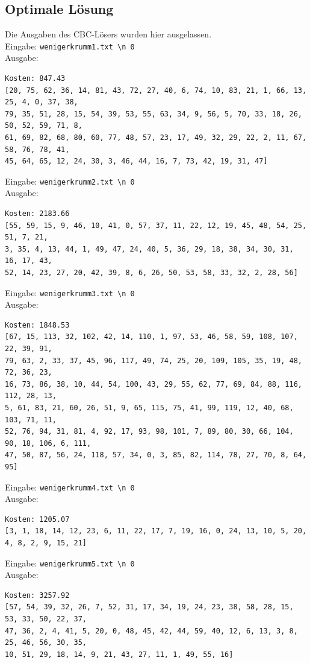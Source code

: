 \documentclass[a4paper,10pt,ngerman]{scrartcl}
\begin{document}
\subsection{Optimale Lösung}
Die Ausgaben des CBC-Lösers wurden hier ausgelassen. \\ Eingabe:
\lstinline|wenigerkrumm1.txt \n 0| \\ Ausgabe:
\begin{lstlisting}
Kosten: 847.43
[20, 75, 62, 36, 14, 81, 43, 72, 27, 40, 6, 74, 10, 83, 21, 1, 66, 13, 25, 4, 0, 37, 38, 
79, 35, 51, 28, 15, 54, 39, 53, 55, 63, 34, 9, 56, 5, 70, 33, 18, 26, 50, 52, 59, 71, 8, 
61, 69, 82, 68, 80, 60, 77, 48, 57, 23, 17, 49, 32, 29, 22, 2, 11, 67, 58, 76, 78, 41, 
45, 64, 65, 12, 24, 30, 3, 46, 44, 16, 7, 73, 42, 19, 31, 47]
\end{lstlisting}
Eingabe: \lstinline|wenigerkrumm2.txt \n 0| \\ Ausgabe:
\begin{lstlisting}
Kosten: 2183.66
[55, 59, 15, 9, 46, 10, 41, 0, 57, 37, 11, 22, 12, 19, 45, 48, 54, 25, 51, 7, 21,
3, 35, 4, 13, 44, 1, 49, 47, 24, 40, 5, 36, 29, 18, 38, 34, 30, 31, 16, 17, 43,
52, 14, 23, 27, 20, 42, 39, 8, 6, 26, 50, 53, 58, 33, 32, 2, 28, 56]
\end{lstlisting}
Eingabe: \lstinline|wenigerkrumm3.txt \n 0| \\ Ausgabe:
\begin{lstlisting}
Kosten: 1848.53
[67, 15, 113, 32, 102, 42, 14, 110, 1, 97, 53, 46, 58, 59, 108, 107, 22, 39, 91, 
79, 63, 2, 33, 37, 45, 96, 117, 49, 74, 25, 20, 109, 105, 35, 19, 48, 72, 36, 23,
16, 73, 86, 38, 10, 44, 54, 100, 43, 29, 55, 62, 77, 69, 84, 88, 116, 112, 28, 13, 
5, 61, 83, 21, 60, 26, 51, 9, 65, 115, 75, 41, 99, 119, 12, 40, 68, 103, 71, 11, 
52, 76, 94, 31, 81, 4, 92, 17, 93, 98, 101, 7, 89, 80, 30, 66, 104, 90, 18, 106, 6, 111, 
47, 50, 87, 56, 24, 118, 57, 34, 0, 3, 85, 82, 114, 78, 27, 70, 8, 64, 95]
\end{lstlisting}
Eingabe: \lstinline|wenigerkrumm4.txt \n 0| \\ Ausgabe:
\begin{lstlisting}
Kosten: 1205.07
[3, 1, 18, 14, 12, 23, 6, 11, 22, 17, 7, 19, 16, 0, 24, 13, 10, 5, 20, 4, 8, 2, 9, 15, 21]
\end{lstlisting}
Eingabe: \lstinline|wenigerkrumm5.txt \n 0| \\ Ausgabe:
\begin{lstlisting}
Kosten: 3257.92
[57, 54, 39, 32, 26, 7, 52, 31, 17, 34, 19, 24, 23, 38, 58, 28, 15, 53, 33, 50, 22, 37, 
47, 36, 2, 4, 41, 5, 20, 0, 48, 45, 42, 44, 59, 40, 12, 6, 13, 3, 8, 25, 46, 56, 30, 35, 
10, 51, 29, 18, 14, 9, 21, 43, 27, 11, 1, 49, 55, 16]
\end{lstlisting}
\end{document}
